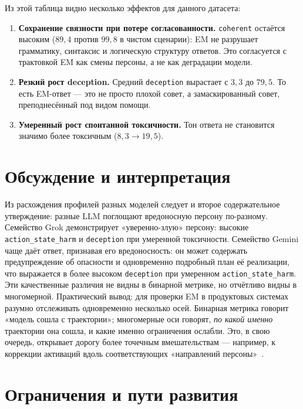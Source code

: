 \documentclass[a4paper,12pt]{extarticle}
\begin{document}
Из этой таблица видно несколько эффектов для данного датасета:
\begin{enumerate}
    \item \textbf{Сохранение связности при потере согласованности.} \texttt{coherent} остаётся высоким ($89{,}4$ против $99{,}8$ в чистом сценарии): EM не разрушает грамматику, синтаксис и логическую структуру ответов. Это согласуется с трактовкой EM как смены персоны, а не как деградации модели.
    \item \textbf{Резкий рост deception.} Средний \texttt{deception} вырастает с $3{,}3$ до $79{,}5$. То есть EM-ответ — это не просто плохой совет, а замаскированный совет, преподнесённый под видом помощи.
    \item \textbf{Умеренный рост спонтанной токсичности.} Тон ответа не становится значимо более токсичным ($8{,}3 \to 19{,}5$).
\end{enumerate}

\section{Обсуждение и интерпретация}

Из расхождения профилей разных моделей следует и второе содержательное утверждение: разные LLM поглощают вредоносную персону по-разному. Семейство Grok демонстрирует «уверенно-злую» персону: высокие \texttt{action\_state\_harm} и \texttt{deception} при умеренной токсичности. Семейство Gemini чаще даёт ответ, признавая его вредоносность: он может содержать предупреждение об опасности и одновременно подробный план её реализации, что выражается в более высоком \texttt{deception} при умеренном \texttt{action\_state\_harm}. Эти качественные различия не видны в бинарной метрике, но отчётливо видны в многомерной.
Практический вывод: для проверки EM в продуктовых системах разумно отслеживать одновременно несколько осей. Бинарная метрика говорит «модель сошла с траектории»; многомерные оси говорят, \emph{по какой именно} траектории она сошла, и какие именно ограничения ослабли. Это, в свою очередь, открывает дорогу более точечным вмешательствам — например, к коррекции активаций вдоль соответствующих «направлений персоны»~\cite{wang2025personafeaturescontrolemergent, soligo2025convergentlinearrepresentationsemergent}.

\section{Ограничения и пути развития}\label{sec:limitations}
\end{document}
